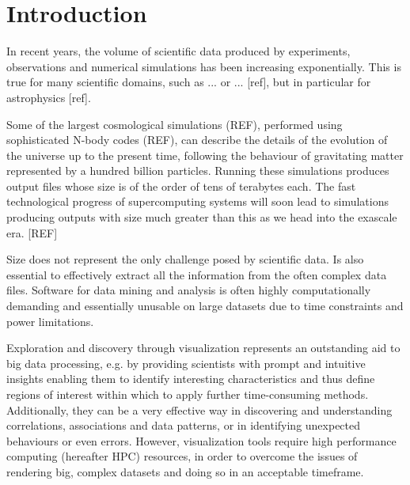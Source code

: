 \documentclass[runningheads,a4paper]{llncs}
\begin{document}
\section{Introduction}
\label{sect:introduction}

In recent years, the volume of scientific data produced by experiments, observations and numerical simulations 
has been increasing exponentially. This is true for many scientific domains, such as ... or ... [ref], but in 
particular for astrophysics [ref]. 


Some of the largest cosmological simulations (REF), performed using sophisticated N-body codes (REF), 
can describe the details of the evolution of the universe up to the present time, following the behaviour of 
gravitating matter represented by a hundred billion particles. Running these simulations produces output files 
whose size is of the order of tens of terabytes each. The fast technological progress of supercomputing systems 
will soon lead to simulations producing outputs with size much greater than this as we head into the exascale 
era. [REF] 

Size does not represent the only challenge posed by scientific data. Is also essential to effectively extract 
all the information from the often complex data files. Software for data mining and analysis is often highly 
computationally demanding and essentially unusable on large datasets due to time constraints and power limitations.   

Exploration and discovery through visualization represents an outstanding aid to big data processing, e.g. by providing 
scientists with prompt and intuitive insights enabling them to identify interesting characteristics 
and thus define regions of interest within which to apply further time-consuming methods. Additionally, 
they can be a very effective way in discovering and understanding correlations, associations and data patterns, 
or in identifying unexpected behaviours or even errors. However, visualization tools require high performance computing 
(hereafter HPC) resources, in order to overcome the issues of rendering big, complex datasets and doing so in an 
acceptable timeframe.
\end{document}

